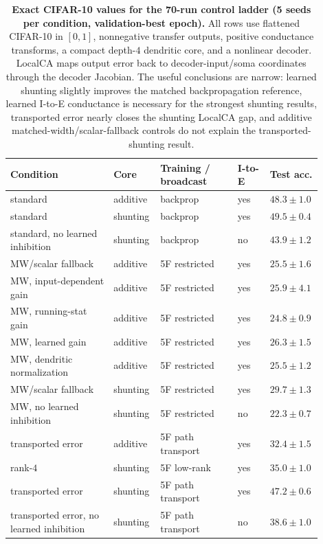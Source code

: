     \begin{table}[htbp]
    \centering
    \scriptsize
    \renewcommand{\arraystretch}{1.06}
    \setlength{\tabcolsep}{3pt}
    \begin{tabular}{@{}L{0.32\linewidth}L{0.12\linewidth}L{0.24\linewidth}L{0.10\linewidth}L{0.12\linewidth}@{}}
    \toprule
    \textbf{Condition} & \textbf{Core} & \textbf{Training / broadcast} & \textbf{I-to-E} & \textbf{Test acc.} \\
    \midrule
    standard & additive & backprop & yes & $48.3 \pm 1.0$ \\
    standard & shunting & backprop & yes & $\mathbf{49.5 \pm 0.4}$ \\
    standard, no learned inhibition & shunting & backprop & no & $43.9 \pm 1.2$ \\
    \midrule
    MW/scalar fallback & additive & 5F restricted & yes & $25.5 \pm 1.6$ \\
    MW, input-dependent gain & additive & 5F restricted & yes & $25.9 \pm 4.1$ \\
    MW, running-stat gain & additive & 5F restricted & yes & $24.8 \pm 0.9$ \\
    MW, learned gain & additive & 5F restricted & yes & $26.3 \pm 1.5$ \\
    MW, dendritic normalization & additive & 5F restricted & yes & $25.5 \pm 1.2$ \\
    MW/scalar fallback & shunting & 5F restricted & yes & $29.7 \pm 1.3$ \\
    MW, no learned inhibition & shunting & 5F restricted & no & $22.3 \pm 0.7$ \\
    \midrule
    transported error & additive & 5F path transport & yes & $32.4 \pm 1.5$ \\
    rank-$4$ & shunting & 5F low-rank & yes & $35.0 \pm 1.0$ \\
    transported error & shunting & 5F path transport & yes & $\mathbf{47.2 \pm 0.6}$ \\
    transported error, no learned inhibition & shunting & 5F path transport & no & $38.6 \pm 1.0$ \\
    \bottomrule
    \end{tabular}
    \renewcommand{\arraystretch}{1.0}
    \caption{\textbf{Exact CIFAR-10 values for the 70-run control ladder (5 seeds per condition, validation-best epoch).} All rows use flattened CIFAR-10 in $[0,1]$, nonnegative transfer outputs, positive conductance transforms, a compact depth-$4$ dendritic core, and a nonlinear decoder. LocalCA maps output error back to decoder-input/soma coordinates through the decoder Jacobian. The useful conclusions are narrow: learned shunting slightly improves the matched backpropagation reference, learned I-to-E conductance is necessary for the strongest shunting results, transported error nearly closes the shunting LocalCA gap, and additive matched-width/scalar-fallback controls do not explain the transported-shunting result.}
    \label{tab:cifar10_mechanism_extension}
    \end{table}
    
